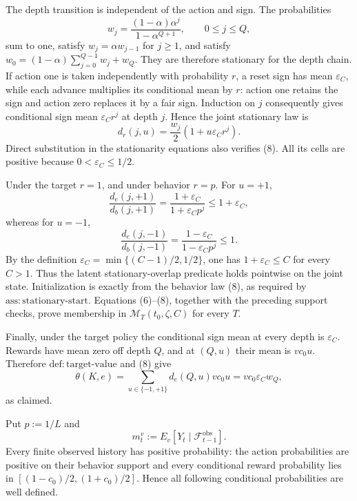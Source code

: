 The depth transition is independent of the action and sign.  The probabilities
\[
 w_j=\frac{(1-\alpha)\alpha^j}{1-\alpha^{Q+1}},\qquad 0\le j\le Q,
\]
sum to one, satisfy \(w_j=\alpha w_{j-1}\) for \(j\ge1\), and satisfy
\(w_0=(1-\alpha)\sum_{j=0}^{Q-1}w_j+w_Q\).  They are therefore stationary for the depth chain.  If action one is taken independently with probability \(r\), a reset sign has mean \(\varepsilon_C\), while each advance multiplies its conditional mean by \(r\): action one retains the sign and action zero replaces it by a fair sign.  Induction on \(j\) consequently gives conditional sign mean \(\varepsilon_Cr^j\) at depth \(j\).  Hence the joint stationary law is
\[
 d_r(j,u)=\frac{w_j}{2}(1+u\varepsilon_Cr^j). \tag{8}
\]
Direct substitution in the stationarity equations also verifies (8).  All its cells are positive because \(0<\varepsilon_C\le1/2\).

Under the target \(r=1\), and under behavior \(r=p\).  For \(u=+1\),
\[
 \frac{d_e(j,+1)}{d_b(j,+1)}
 =\frac{1+\varepsilon_C}{1+\varepsilon_Cp^j}\le1+\varepsilon_C,
\]
whereas for \(u=-1\),
\[
 \frac{d_e(j,-1)}{d_b(j,-1)}
 =\frac{1-\varepsilon_C}{1-\varepsilon_Cp^j}\le1.
\]
By the definition \(\varepsilon_C=\min\{(C-1)/2,1/2\}\), one has \(1+\varepsilon_C\le C\) for every \(C>1\).  Thus the latent stationary-overlap predicate holds pointwise on the joint state.  Initialization is exactly from the behavior law (8), as required by \(\mathrm{ass{:}stationary\text{-}start}\).  Equations (6)--(8), together with the preceding support checks, prove membership in \(\mathcal M_T(t_0,\zeta,C)\) for every \(T\).

Finally, under the target policy the conditional sign mean at every depth is \(\varepsilon_C\).  Rewards have mean zero off depth \(Q\), and at \((Q,u)\) their mean is \(vc_0u\).  Therefore \(\mathrm{def{:}target\text{-}value}\) and (8) give
\[
 \theta(K,e)=\sum_{u\in\{-1,+1\}}d_e(Q,u)vc_0u
 =vc_0\varepsilon_Cw_Q,
\]
as claimed.

Put \(p:=1/L\) and
\[
 m_t^v:=E_v[Y_t\mid\mathcal F_{t-1}^{\mathrm{obs}}].
\]
Every finite observed history has positive probability: the action probabilities are positive on their behavior support and every conditional reward probability lies in \([(1-c_0)/2,(1+c_0)/2]\).  Hence all following conditional probabilities are well defined.

